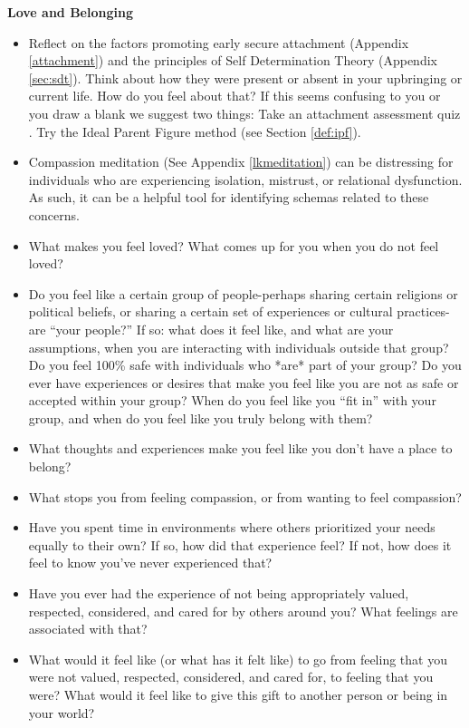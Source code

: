 \documentclass[12pt,letterpaper]{article}
\begin{document}
\vspace{\baselineskip}

\noindent \textbf{Love and Belonging}
\begin{itemize}
    \item Reflect on the factors promoting early secure attachment (Appendix \ref{attachment}) and the principles of Self Determination Theory (Appendix \ref{sec:sdt}). Think about how they were present or absent in your upbringing or current life. How do you feel about that? If this seems confusing to you or you draw a blank we suggest two things: Take an attachment assessment quiz \cite{attachmentProject}. Try the Ideal Parent Figure method (see Section \ref{def:ipf}).
    \item Compassion meditation (See Appendix \ref{lkmeditation}) can be distressing for individuals who are experiencing isolation, mistrust, or relational dysfunction. As such, it can be a helpful tool for identifying schemas related to these concerns.
    \item What makes you feel loved? What comes up for you when you do not feel loved?
    \item Do you feel like a certain group of people-perhaps sharing certain religions or political beliefs, or sharing a certain set of experiences or cultural practices-are “your people?”  If so: what does it feel like, and what are your assumptions, when you are interacting with individuals outside that group? Do you feel 100\% safe with individuals who *are* part of your group? Do you ever have experiences or desires that make you feel like you are not as safe or accepted within your group? When do you feel like you “fit in” with your group, and when do you feel like you truly belong with them?
    \item What thoughts and experiences make you feel like you don't have a place to belong?
    \item What stops you from feeling compassion, or from wanting to feel compassion?
    \item Have you spent time in environments where others prioritized your needs equally to their own? If so, how did that experience feel? If not, how does it feel to know you've never experienced that?
    \item Have you ever had the experience of not being appropriately valued, respected, considered, and cared for by others around you?  What feelings are associated with that?
    \item What would it feel like (or what has it felt like) to go from feeling that you were not valued, respected, considered, and cared for, to feeling that you were? What would it feel like to give this gift to another person or being in your world?

\end{itemize}
\end{document}
